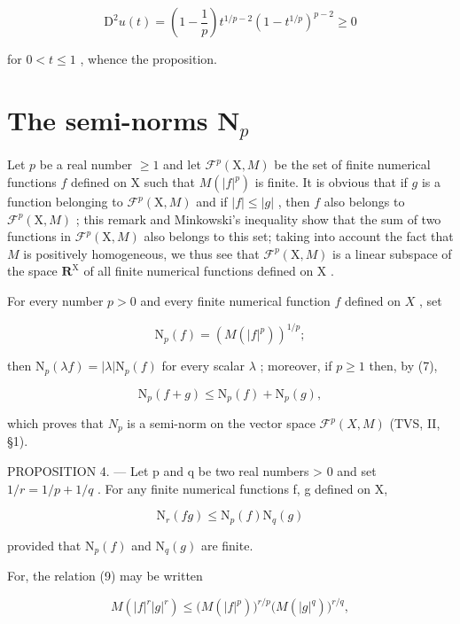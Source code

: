\[
\mathrm{D} ^ {2} u (t) = \left(1 - \frac {1}{p}\right) t ^ {1 / p - 2} (1 - t ^ {1 / p}) ^ {p - 2} \geqslant 0
\]

for \(0 < t \leqslant 1\) , whence the proposition.

\section{\texorpdfstring{The semi-norms \(\mathbf{N}_p\)}{The semi-norms N sub p}}

Let \(p\) be a real number \(\geqslant 1\) and let \(\mathcal{F}^p(\mathrm{X},M)\) be the set of finite numerical functions \(f\) defined on \(\mathrm{X}\) such that \(M(|f|^p)\) is finite. It is obvious that if \(g\) is a function belonging to \(\mathcal{F}^p(\mathrm{X},M)\) and if \(|f| \leqslant |g|\) , then \(f\) also belongs to \(\mathcal{F}^p(\mathrm{X},M)\) ; this remark and Minkowski's inequality show that the sum of two functions in \(\mathcal{F}^p(\mathrm{X},M)\) also belongs to this set; taking into account the fact that \(M\) is positively homogeneous, we thus see that \(\mathcal{F}^p(\mathrm{X},M)\) is a linear subspace of the space \(\mathbf{R}^{\mathrm{X}}\) of all finite numerical functions defined on \(\mathrm{X}\) .

For every number \(p > 0\) and every finite numerical function \(f\) defined on \(X\) , set

\[
\mathrm{N} _ {p} (f) = \left(M (| f | ^ {p})\right) ^ {1 / p};
\]

then \(\mathrm{N}_p(\lambda f) = |\lambda |\mathrm{N}_p(f)\) for every scalar \(\lambda\) ; moreover, if \(p \geqslant 1\) then, by (7),

\[
\mathrm{N} _ {p} (f + g) \leqslant \mathrm{N} _ {p} (f) + \mathrm{N} _ {p} (g),\tag{8}
\]

which proves that \(N_{p}\) is a semi-norm on the vector space \(\mathcal{F}^{p}(X,M)\) (TVS, II, §1).

PROPOSITION 4. --- Let p and q be two real numbers \textgreater{} 0 and set \(1/r = 1/p + 1/q\) . For any finite numerical functions f, g defined on X,

\[
\mathrm{N} _ {r} (f g) \leqslant \mathrm{N} _ {p} (f) \mathrm{N} _ {q} (g)\tag{9}
\]

provided that \(\mathrm{N}_p(f)\) and \(\mathrm{N}_q(g)\) are finite.

For, the relation (9) may be written

\[
M (| f | ^ {r} | g | ^ {r}) \leqslant \bigl (M (| f | ^ {p}) \bigr) ^ {r / p} \bigl (M (| g | ^ {q}) \bigr) ^ {r / q},
\]

